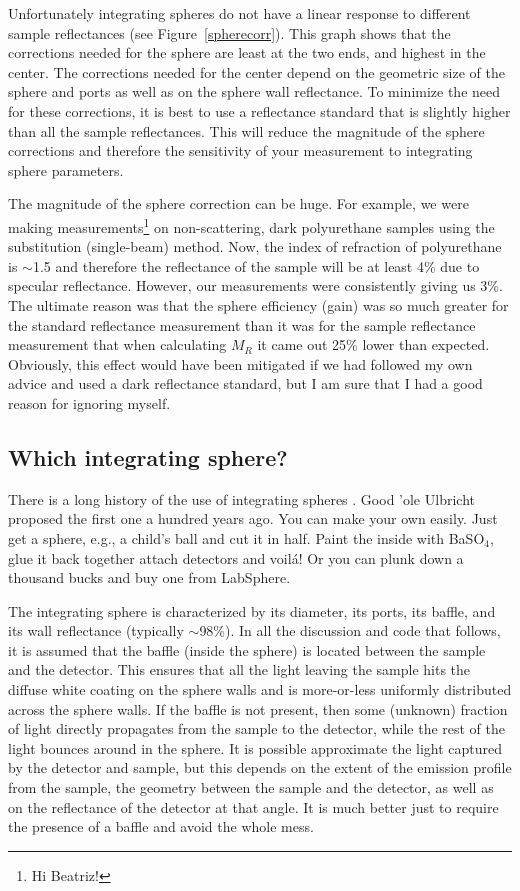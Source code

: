 \documentclass{article}
\begin{document}
Unfortunately integrating spheres do not
have a linear response to different sample reflectances (see Figure~\ref{spherecorr}).
This graph shows that the corrections needed for the sphere are least at
the two ends, and highest in the center.  The corrections needed for the
center depend on the geometric size of the sphere and ports as well as
on the sphere wall reflectance.  To minimize the need for these corrections,
it is best to use a reflectance standard that is slightly higher than all
the sample reflectances.  This will reduce the magnitude of the sphere 
corrections and therefore the sensitivity of your measurement to integrating
sphere parameters.

The magnitude of the sphere correction can be huge.  For example, we were making
measurements\footnote{Hi Beatriz!} on non-scattering, dark polyurethane samples
using the substitution (single-beam) method.
Now, the index of refraction of polyurethane is $\sim$1.5 and therefore the 
reflectance of the sample will be at least 4\% due to specular reflectance.
However, our measurements were consistently giving us 3\%.  The ultimate reason
was that the sphere efficiency (gain) was so much greater for the standard reflectance
measurement than it was for the sample reflectance measurement that when
calculating $M_R$ it came out 25\% lower than expected.  Obviously, this effect
would have been mitigated if we had followed my own advice and used a dark
reflectance standard, but I am sure that I had a good reason for ignoring myself.

\subsection{Which integrating sphere?}
There is a long history of the use of integrating spheres%
\cite{sumpner92,ulbricht00,taylor20,jacquez55,goebel67,pickering92}.  Good 'ole  Ulbricht
proposed the first one a hundred years ago\cite{ulbricht00}.  You can make your own easily.  Just
get a sphere, e.g., a child's ball and cut it in half.  Paint the inside with
BaSO$_4$, glue it back together attach detectors and voil\'{a}!  Or you can plunk
down a thousand bucks and buy one from LabSphere.  

The integrating sphere is characterized by its diameter, its ports, its baffle,
and its wall reflectance (typically $\sim$98\%).  In all the discussion and
code that follows, it is assumed that the baffle (inside the sphere) is located
between the sample and the detector.  This ensures that all the light leaving 
the sample hits the diffuse white coating on the sphere walls and is more-or-less
uniformly distributed across the sphere walls.  If the baffle is not present, then
some (unknown) fraction of light directly propagates from the sample to the
detector, while the rest of the light bounces around in the sphere.  It is
possible approximate the light captured by the detector and sample, but this
depends on the extent of the emission profile from the sample, the geometry
between the sample and the detector, as well as on the reflectance of the
detector at that angle.  It is much better just to require the presence of a
baffle and avoid the whole mess.  
\end{document}
